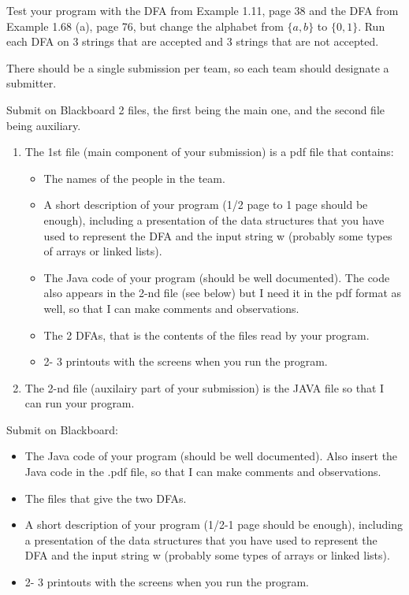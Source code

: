 \documentclass[11pt]{article}
\begin{document}
Test your program with the DFA  from Example 1.11, page 38 and the DFA from Example 1.68 (a), page 76, but  change the alphabet from $\{a,b\}$ to $\{0,1\}$.  Run  each  DFA on 3 strings that are accepted and 3 strings that are not accepted.
\bigskip

There should be a single submission per team, so each team should designate a submitter.

Submit on Blackboard 2 files, the first being the main one, and the second file being auxiliary.  \begin{enumerate}

  \item The 1st file (main component of your submission) is a pdf file that contains:
        \begin{itemize}
          \item The names of the people in the team.
          \item A short description of your program (1/2 page to 1 page should be enough), including a presentation of the data structures that you have used to represent the DFA and the input string w (probably some types of arrays or linked lists).
          \item The Java code of your program (should be well documented). The code also appears in the 2-nd  file  (see below) but I need it in the pdf format as well, so that I can make comments and observations.
          \item The  2  DFAs, that is the contents of the files read by your program.

          \item 2- 3 printouts with the screens when you run the program.
        \end{itemize}
  \item The 2-nd  file (auxilairy part of your submission)  is the JAVA file so that I can run your program.
\end{enumerate}
\medskip


  Submit on Blackboard:
  \begin{itemize}
    \item The Java code of your program (should be well documented). Also insert the Java code in the .pdf file, so that I can make comments and observations.
    \item The files that give the two DFAs.
    \item A short description of your program (1/2-1 page should be enough), including a presentation of the data structures that you have used to represent the DFA and the input string w (probably some types of arrays or linked lists).
    \item 2- 3 printouts with the screens when you run the program.
  \end{itemize}
\fi
\end{document}
